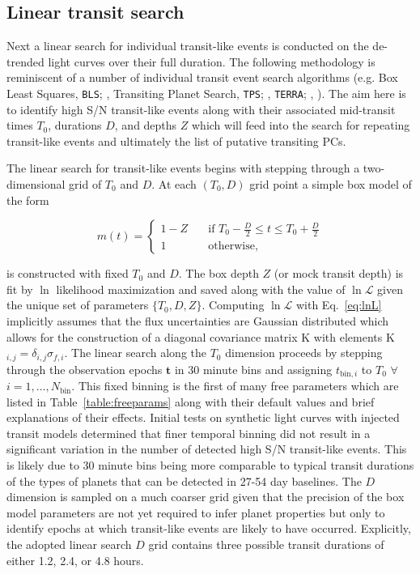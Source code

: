\subsection{Linear transit search} \label{sect:linearsearch}
Next a linear search for individual transit-like events is conducted on the de-trended light curves over
their full duration. The following methodology is reminiscent of a number of individual transit event
search algorithms
(e.g. Box Least Squares, \texttt{BLS}; \citealt{kovacs02}, Transiting Planet Search, \texttt{TPS};
\citealt{jenkins10,christiansen13,christiansen15,christiansen16}, \texttt{TERRA};
\citealt{petigura13a}, \citealt{foremanmackey15a}). The aim here is
to identify high S/N transit-like events along with their associated mid-transit times $T_0$,
durations $D$, and depths $Z$ which will feed into the search for repeating transit-like
events and ultimately the list of putative transiting PCs.

The linear search for transit-like events begins with stepping through
a two-dimensional grid of $T_0$ and $D$. At each $(T_0,D)$ grid point a simple box model of the form

\begin{equation}
  m(t) =
  \begin{cases}
    1-Z & \quad \text{if } T_0-\frac{D}{2} \leq t \leq T_0+\frac{D}{2} \\
    1 & \quad \text{otherwise,}
  \end{cases}
\end{equation}

\noindent is constructed with fixed $T_0$ and $D$. The box depth $Z$ (or mock transit depth)
is fit by $\ln$ likelihood maximization and saved along with the value of $\ln{\mathcal{L}}$
given the unique set of parameters $\{T_0,D,Z\}$. Computing $\ln{\mathcal{L}}$ with Eq.~\ref{eq:lnL}
implicitly assumes that the flux uncertainties are Gaussian distributed which allows for the
construction of a diagonal covariance matrix K with elements K$_{i,j} = \delta_{i,j} \sigma_{f,i}$.
The linear search along the $T_0$ dimension proceeds by stepping through the observation epochs
$\mathbf{t}$ in 30 minute bins and assigning
$t_{\text{bin},i}$ to $T_0$ $\forall$ $i=1,\dots,N_{\text{bin}}$.
This fixed binning is the first of many \pipeline{} free parameters which are listed in
Table~\ref{table:freeparams} along with their default values and brief explanations of their
effects. Initial \pipeline{} tests on synthetic light curves with injected transit models
determined that finer temporal binning did not result in a significant variation in the number
of detected high S/N transit-like events. This is likely due to 30 minute bins being more comparable
to typical transit durations of the types of planets that can be detected in 27-54 day baselines.
The $D$ dimension is sampled on a much coarser grid
given that the precision of the box model parameters are not yet required to infer planet properties
but only to identify epochs at which transit-like events are likely to have occurred. Explicitly, the
adopted linear search $D$ grid contains three possible transit durations of either 1.2, 2.4, or 4.8 hours.

